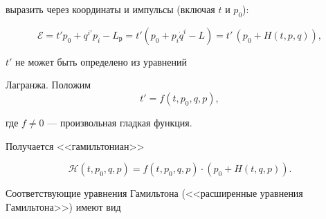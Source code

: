 выразить через координаты и импульсы (включая $t$ и $p_0$):

$$

 \mathcal{E}=t'p_0+q^{i\prime}p_i-L_\textrm{р}

 =t'(p_0+p_i\dot q^i-L)

 =t'\,(p_0+H(t,p,q)),

$$

  $t'$ не может быть определено из уравнений

  Лагранжа. Положим $$t'=f(t,p_0,q,p),$$

 где $f\not=0$ --- произвольная гладкая функция.

 Получается <<гамильтониан>>

\begin{equation}\label{H=f(P+H)}

  \mathcal{H}(t,p_0,q,p)=f(t,p_0,q,p)\cdot(p_0+H(t,q,p)).

\end{equation}

  Соответствующие уравнения Гамильтона (<<расширенные уравнения Гамильтона>>) имеют вид











